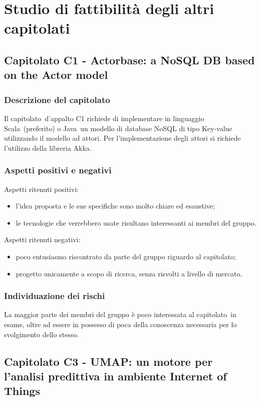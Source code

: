 \documentclass[../StudioDiFattibilita.tex]{subfiles}
\begin{document}
\section{Studio di fattibilità degli altri capitolati}
	\subsection{Capitolato C1 - Actorbase: a NoSQL DB based on the Actor model}
		\subsubsection{Descrizione del capitolato}
		Il capitolato\g\ d'appalto C1 richiede di implementare in linguaggio Scala\g\ (preferito) o Java\g\ un modello di database NoSQL di tipo Key-value utilizzando il modello ad attori. Per l'implementazione degli attori si richiede l'utilizzo della libreria Akka\g.
		\subsubsection{Aspetti positivi e negativi}
		Aspetti ritenuti positivi:
			\begin{itemize}
				\item l'idea proposta e le sue specifiche sono molto chiare ed esaustive;
				\item le tecnologie che verrebbero usate risultano interessanti ai membri del gruppo.
			\end{itemize}
		Aspetti ritenuti negativi:
			\begin{itemize}
				\item poco entusiasmo riscontrato da parte del gruppo riguardo al capitolato\g;
				\item progetto unicamente a scopo di ricerca, senza risvolti a livello di mercato.
			\end{itemize}
		\subsubsection{Individuazione dei rischi}
		La maggior parte dei membri del gruppo è poco interessata al capitolato\g\ in esame, oltre ad essere in possesso di poca della conoscenza necessaria per lo svolgimento dello stesso.		
	\subsection{Capitolato C3 - UMAP: un motore per l'analisi predittiva in ambiente Internet of Things}
\end{document}

